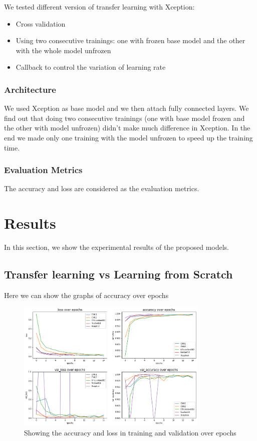 \documentclass[conference]{IEEEtran}
\begin{document}
We tested different version of transfer learning with Xception:
\begin{itemize}
    \item Cross validation
    \item Using two consecutive trainings: one with frozen base model and the other with the whole model unfrozen
    \item Callback to control the variation of learning rate
\end{itemize}

\subsubsection{Architecture}
We used Xception as base model and we then attach fully connected layers.
We find out that doing two consecutive trainings (one with base model frozen 
and the other with model unfrozen) didn't make much difference in Xception.
In the end we made only one training with the model unfrozen to speed up
the training time.

\subsubsection{Evaluation Metrics}
The accuracy and loss are considered as the evaluation metrics.



\section{Results}
In this section, we show the experimental results of the proposed models. 
\subsection{Transfer learning vs Learning from Scratch}
Here  we can show the graphs of accuracy over epochs

\begin{figure}[h]
\centering
\includegraphics[width=3.6in]{performance_5.png}
\caption{Showing the accuracy and loss in training and validation over epochs}
\label{bench}
\end{figure}
\end{document}
